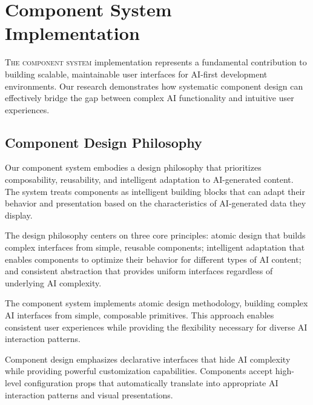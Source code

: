 
\section*{Component System Implementation}

\lettrine{T}{he component system} implementation represents a fundamental contribution to building scalable, maintainable user interfaces for AI-first development environments. Our research demonstrates how systematic component design can effectively bridge the gap between complex AI functionality and intuitive user experiences.

\subsection*{Component Design Philosophy}

Our component system embodies a design philosophy that prioritizes composability, reusability, and intelligent adaptation to AI-generated content. The system treats components as intelligent building blocks that can adapt their behavior and presentation based on the characteristics of AI-generated data they display.

The design philosophy centers on three core principles: atomic design that builds complex interfaces from simple, reusable components; intelligent adaptation that enables components to optimize their behavior for different types of AI content; and consistent abstraction that provides uniform interfaces regardless of underlying AI complexity.

\begin{infobox}[title=Component Design Principles]
The component system implements atomic design methodology, building complex AI interfaces from simple, composable primitives. This approach enables consistent user experiences while providing the flexibility necessary for diverse AI interaction patterns.
\end{infobox}

Component design emphasizes declarative interfaces that hide AI complexity while providing powerful customization capabilities. Components accept high-level configuration props that automatically translate into appropriate AI interaction patterns and visual presentations.

